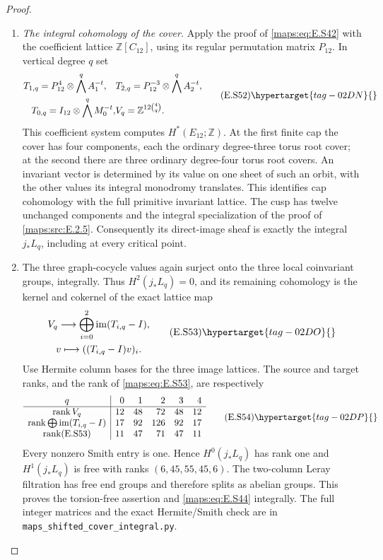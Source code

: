 \begin{proof}
\begin{enumerate}[label={$\langle1\rangle$\arabic*.},leftmargin=*]
\item \emph{The integral cohomology of the cover.}
Apply the proof of \eqref{maps:eq:E.S42} with the coefficient lattice
$\mathbb Z[C_{12}]$, using its regular permutation matrix
$P_{12}$. In vertical degree $q$ set
\[
 \begin{aligned}
 T_{1,q}=P_{12}^4\otimes\bigwedge^q A_1^{-t},\quad
 &T_{2,q}=P_{12}^{-3}\otimes\bigwedge^q A_2^{-t},\\
 T_{0,q}=I_{12}\otimes\bigwedge^q M_0^{-t},
 &V_q=\mathbb Z^{12\binom4q}.
 \end{aligned}
 \tag{E.S52}\hypertarget{tag-02DN}{}\label{maps:eq:E.S52}
\]
This coefficient system computes $H^*(E_{12};\mathbb Z)$.
 At the first finite
cap the cover has four components, each the ordinary
degree-three torus root cover; at the second there are
three ordinary degree-four torus root covers. An invariant
vector is determined by its value on one sheet of such
an orbit, with the other values its integral monodromy
translates. This identifies cap cohomology with the full
primitive invariant lattice. The cusp has twelve unchanged
components and the integral specialization of the proof of \cref{maps:src:E.2.5}.
Consequently its direct-image sheaf is exactly the integral
$j_*L_q$, including at every critical point.

\item The three graph-cocycle values again surject onto the
three local coinvariant groups, integrally. Thus $H^2(j_*L_q)=0$,
and its remaining cohomology is the kernel and cokernel
of the exact lattice map
\[
 \begin{gathered}
 V_q\longrightarrow
        \bigoplus_{i=0}^2\operatorname{im}(T_{i,q}-I),\\
           v\longmapsto((T_{i,q}-I)v)_i.
 \end{gathered}
 \tag{E.S53}\hypertarget{tag-02DO}{}\label{maps:eq:E.S53}
\]
Use Hermite column bases for the three image lattices. The source and target ranks,
and the rank of \eqref{maps:eq:E.S53}, are respectively
\[
 \begin{array}{c|rrrrr}
 q&0&1&2&3&4\\ \hline
 \operatorname{rank}V_q&12&48&72&48&12\\
 \operatorname{rank}\bigoplus\operatorname{im}(T_{i,q}-I)
                      &17&92&126&92&17\\
 \operatorname{rank}(\text{E.S53})&11&47&71&47&11
 \end{array}
 \tag{E.S54}\hypertarget{tag-02DP}{}\label{maps:eq:E.S54}
\]
Every nonzero Smith entry is one. Hence $H^0(j_*L_q)$
has rank one and $H^1(j_*L_q)$ is free with ranks
$(6,45,55,45,6)$. The two-column Leray filtration has
free end groups and therefore splits as abelian groups.
This proves the torsion-free assertion and \eqref{maps:eq:E.S44}
integrally. The full integer matrices and the exact
Hermite/Smith check are in
\texttt{maps\_shifted\_cover\_integral.py}.


\end{enumerate}
\end{proof}
